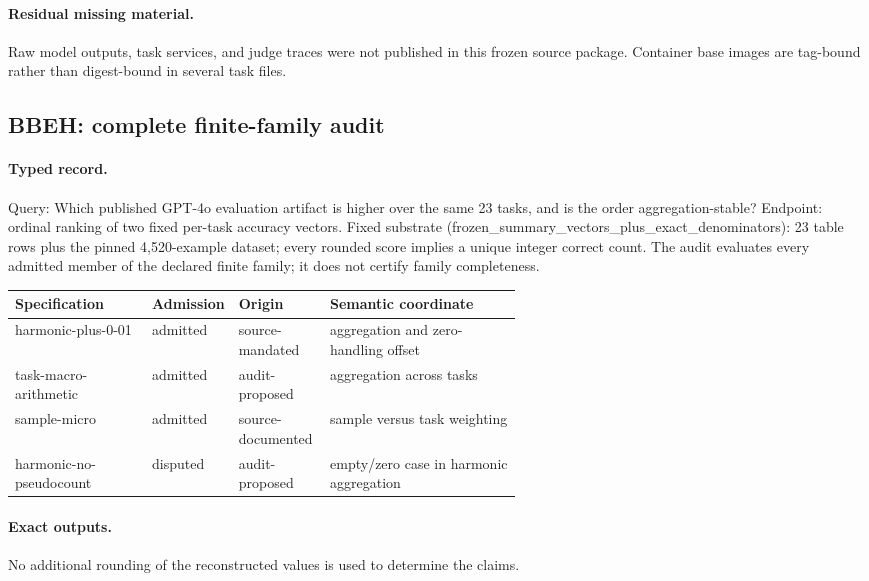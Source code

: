 \paragraph{Residual missing material.} Raw model outputs, task services, and judge traces were not published in this frozen source package. Container base images are tag-bound rather than digest-bound in several task files.


\subsection{BBEH: complete finite-family audit}\label{app:r8-bbeh}

\paragraph{Typed record.} Query: Which published GPT-4o evaluation artifact is higher over the same 23 tasks, and is the order aggregation-stable? Endpoint: ordinal ranking of two fixed per-task accuracy vectors. Fixed substrate (frozen\_summary\_vectors\_plus\_exact\_denominators): 23 table rows plus the pinned 4,520-example dataset; every rounded score implies a unique integer correct count. The audit evaluates every admitted member of the declared finite family; it does not certify family completeness.

\begingroup
\scriptsize
\begin{tabularx}{\linewidth}{@{}p{0.27\linewidth}p{0.14\linewidth}p{0.18\linewidth}X@{}}
\toprule
Specification & Admission & Origin & Semantic coordinate \\
\midrule
harmonic-plus-0-01 & admitted & source-mandated & aggregation and zero-handling offset \\
task-macro-arithmetic & admitted & audit-proposed & aggregation across tasks \\
sample-micro & admitted & source-documented & sample versus task weighting \\
harmonic-no-pseudocount & disputed & audit-proposed & empty/zero case in harmonic aggregation \\
\bottomrule
\end{tabularx}
\endgroup

\paragraph{Exact outputs.} No additional rounding of the reconstructed values is used to determine the claims.

